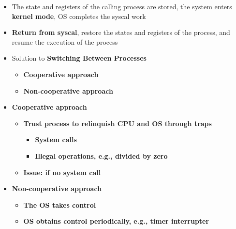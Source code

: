 \documentclass[a4paper,11pt,english]{article}
\begin{document}
\begin{itemize}
\begin{itemize}
            \item The state and registers of the calling process are stored, the system enters \textbf{\color{red}kernel mode}, OS completes the syscal work
            \item \textbf{\color{blue}Return from syscal}, restore the states and registers of the process, and resume the execution of the process
            \item Solution to \textbf{\color{red}Switching Between Processes}
                \begin{itemize}
                    \item \textbf{\color{blue}Cooperative approach}
                    \item \textbf{\color{blue}Non-cooperative approach}
                \end{itemize}
            \item \textbf{\color{blue}Cooperative approach}
                \begin{itemize}
                    \item \textbf{Trust process to relinquish CPU and OS through traps}
                        \begin{itemize}
                            \item \textbf{System calls}
                            \item \textbf{\color{red}Illegal operations, e.g., divided by zero}
                        \end{itemize} 
                    \item \textbf{\color{red}Issue: if no system call}
                \end{itemize}
            \item \textbf{\color{blue}Non-cooperative approach}
                \begin{itemize}
                    \item \textbf{The OS takes control}
                    \item \textbf{OS obtains control periodically, e.g., timer interrupter}
                \end{itemize}
        \end{itemize}
\end{itemize}
\end{document}
